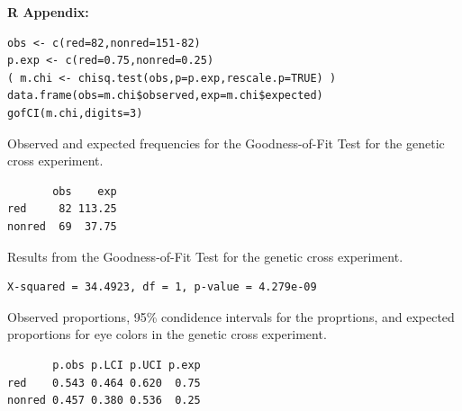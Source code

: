 \documentclass[10pt,openany]{book}\usepackage[]{graphicx}\usepackage[]{color}
\makeatletter
\newenvironment{kframe}{%
 \def\at@end@of@kframe{}%
 \ifinner\ifhmode%
  \def\at@end@of@kframe{\end{minipage}}%
  \begin{minipage}{\columnwidth}%
 \fi\fi%
 \def\FrameCommand##1{\hskip\@totalleftmargin \hskip-\fboxsep
 \colorbox{shadecolor}{##1}\hskip-\fboxsep
     \hskip-\linewidth \hskip-\@totalleftmargin \hskip\columnwidth}%
 \MakeFramed {\advance\hsize-\width
   \@totalleftmargin\z@ \linewidth\hsize
   \@setminipage}}%
 {\par\unskip\endMakeFramed%
 \at@end@of@kframe}
\newenvironment{knitrout}{}{} %
\makeatother
\begin{document}
\begin{minipage}{\textwidth}
\textbf{R Appendix:}
\begin{knitrout}
\color{fgcolor}\begin{kframe}
\begin{verbatim}
obs <- c(red=82,nonred=151-82)
p.exp <- c(red=0.75,nonred=0.25)
( m.chi <- chisq.test(obs,p=p.exp,rescale.p=TRUE) )
data.frame(obs=m.chi$observed,exp=m.chi$expected)
gofCI(m.chi,digits=3)
\end{verbatim}
\end{kframe}
\end{knitrout}
\end{minipage}

\begin{table}[h]
  \caption{Observed and expected frequencies for the Goodness-of-Fit Test for the genetic cross experiment.}
  \label{tab:GOFgenRes}
  \vspace{-12pt}
\begin{knitrout}
\color{fgcolor}\begin{kframe}
\begin{verbatim}
       obs    exp
red     82 113.25
nonred  69  37.75
\end{verbatim}
\end{kframe}
\end{knitrout}
\end{table}

\begin{table}[h]
  \caption{Results from the Goodness-of-Fit Test for the genetic cross experiment.}
  \label{tab:GOFgenChi}
  \vspace{-12pt}
\begin{knitrout}
\color{fgcolor}\begin{kframe}
\begin{verbatim}
X-squared = 34.4923, df = 1, p-value = 4.279e-09
\end{verbatim}
\end{kframe}
\end{knitrout}
\end{table}

\begin{table}[h]
  \caption{Observed proportions, 95\% condidence intervals for the proprtions, and expected proportions for eye colors in the genetic cross experiment.}
  \label{tab:GOFgenCIs}
  \vspace{-12pt}
\begin{knitrout}
\color{fgcolor}\begin{kframe}
\begin{verbatim}
       p.obs p.LCI p.UCI p.exp
red    0.543 0.464 0.620  0.75
nonred 0.457 0.380 0.536  0.25
\end{verbatim}
\end{kframe}
\end{knitrout}
\end{table}
\end{document}
